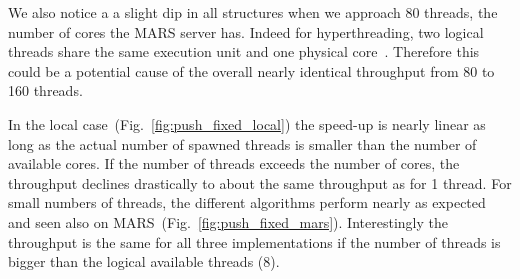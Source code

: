 \documentclass [10pt]{scrartcl}
\begin{document}
   We also notice a a slight dip in all structures when we approach 80 threads, the number of cores the MARS server has.
   Indeed for hyperthreading, two logical threads share the same execution unit and one physical core~\cite{hyperT}. Therefore this could be a potential cause of the overall nearly identical throughput from 80 to 160 threads.
   
   
   
   
   
   
   In the local case~(Fig.~\ref{fig:push_fixed_local}) the speed-up is nearly linear as long as the actual number of spawned threads is smaller than the number of available cores. If the number of threads exceeds the number of cores, the throughput declines drastically to about the same throughput as for 1 thread.  For small numbers of threads, the different algorithms perform nearly as expected and seen also on MARS~(Fig.~\ref{fig:push_fixed_mars}).
   Interestingly the throughput is the same for all three implementations if the number of threads is bigger than the logical available threads (8). 
   
\end{document}
